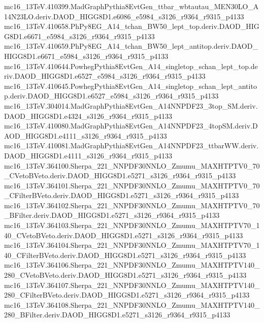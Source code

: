\begin{scriptsize}
mc16\_13TeV.410399.MadGraphPythia8EvtGen\_ttbar\_wbtautau\_MEN30LO\_A14N23LO.deriv.DAOD\_HIGG8D1.e6086\_e5984\_s3126\_r9364\_r9315\_p4133 \\
mc16\_13TeV.410658.PhPy8EG\_A14\_tchan\_BW50\_lept\_top.deriv.DAOD\_HIGG8D1.e6671\_e5984\_s3126\_r9364\_r9315\_p4133 \\
mc16\_13TeV.410659.PhPy8EG\_A14\_tchan\_BW50\_lept\_antitop.deriv.DAOD\_HIGG8D1.e6671\_e5984\_s3126\_r9364\_r9315\_p4133 \\
mc16\_13TeV.410644.PowhegPythia8EvtGen\_A14\_singletop\_schan\_lept\_top.deriv.DAOD\_HIGG8D1.e6527\_e5984\_s3126\_r9364\_r9315\_p4133 \\
mc16\_13TeV.410645.PowhegPythia8EvtGen\_A14\_singletop\_schan\_lept\_antitop.deriv.DAOD\_HIGG8D1.e6527\_e5984\_s3126\_r9364\_r9315\_p4133 \\
mc16\_13TeV.304014.MadGraphPythia8EvtGen\_A14NNPDF23\_3top\_SM.deriv.DAOD\_HIGG8D1.e4324\_s3126\_r9364\_r9315\_p4133 \\
mc16\_13TeV.410080.MadGraphPythia8EvtGen\_A14NNPDF23\_4topSM.deriv.DAOD\_HIGG8D1.e4111\_s3126\_r9364\_r9315\_p4133 \\
mc16\_13TeV.410081.MadGraphPythia8EvtGen\_A14NNPDF23\_ttbarWW.deriv.DAOD\_HIGG8D1.e4111\_s3126\_r9364\_r9315\_p4133 \\
mc16\_13TeV.364100.Sherpa\_221\_NNPDF30NNLO\_Zmumu\_MAXHTPTV0\_70\_CVetoBVeto.deriv.DAOD\_HIGG8D1.e5271\_s3126\_r9364\_r9315\_p4133 \\
mc16\_13TeV.364101.Sherpa\_221\_NNPDF30NNLO\_Zmumu\_MAXHTPTV0\_70\_CFilterBVeto.deriv.DAOD\_HIGG8D1.e5271\_s3126\_r9364\_r9315\_p4133 \\
mc16\_13TeV.364102.Sherpa\_221\_NNPDF30NNLO\_Zmumu\_MAXHTPTV0\_70\_BFilter.deriv.DAOD\_HIGG8D1.e5271\_s3126\_r9364\_r9315\_p4133 \\
mc16\_13TeV.364103.Sherpa\_221\_NNPDF30NNLO\_Zmumu\_MAXHTPTV70\_140\_CVetoBVeto.deriv.DAOD\_HIGG8D1.e5271\_s3126\_r9364\_r9315\_p4133 \\
mc16\_13TeV.364104.Sherpa\_221\_NNPDF30NNLO\_Zmumu\_MAXHTPTV70\_140\_CFilterBVeto.deriv.DAOD\_HIGG8D1.e5271\_s3126\_r9364\_r9315\_p4133 \\
mc16\_13TeV.364106.Sherpa\_221\_NNPDF30NNLO\_Zmumu\_MAXHTPTV140\_280\_CVetoBVeto.deriv.DAOD\_HIGG8D1.e5271\_s3126\_r9364\_r9315\_p4133 \\
mc16\_13TeV.364107.Sherpa\_221\_NNPDF30NNLO\_Zmumu\_MAXHTPTV140\_280\_CFilterBVeto.deriv.DAOD\_HIGG8D1.e5271\_s3126\_r9364\_r9315\_p4133 \\
mc16\_13TeV.364108.Sherpa\_221\_NNPDF30NNLO\_Zmumu\_MAXHTPTV140\_280\_BFilter.deriv.DAOD\_HIGG8D1.e5271\_s3126\_r9364\_r9315\_p4133 \\

\end{scriptsize}
